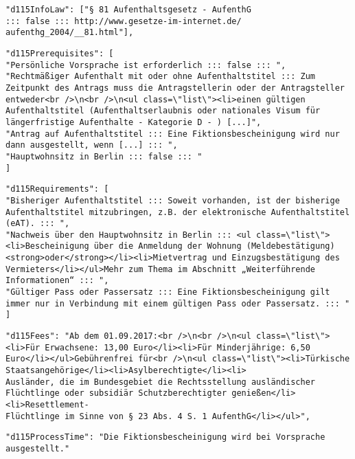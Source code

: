 \begin{verbatim}
"d115InfoLaw": ["§ 81 Aufenthaltsgesetz - AufenthG 
::: false ::: http://www.gesetze-im-internet.de/
aufenthg_2004/__81.html"],
\end{verbatim}

\begin{verbatim}
"d115Prerequisites": [
"Persönliche Vorsprache ist erforderlich ::: false ::: ",
"Rechtmäßiger Aufenthalt mit oder ohne Aufenthaltstitel ::: Zum Zeitpunkt des Antrags muss die Antragstellerin oder der Antragsteller entweder<br />\n<br />\n<ul class=\"list\"><li>einen gültigen Aufenthaltstitel (Aufenthaltserlaubnis oder nationales Visum für längerfristige Aufenthalte - Kategorie D - ) [...]",
"Antrag auf Aufenthaltstitel ::: Eine Fiktionsbescheinigung wird nur dann ausgestellt, wenn [...] ::: ",
"Hauptwohnsitz in Berlin ::: false ::: "
]
\end{verbatim}

\begin{verbatim}
"d115Requirements": [
"Bisheriger Aufenthaltstitel ::: Soweit vorhanden, ist der bisherige Aufenthaltstitel mitzubringen, z.B. der elektronische Aufenthaltstitel (eAT). ::: ",
"Nachweis über den Hauptwohnsitz in Berlin ::: <ul class=\"list\"><li>Bescheinigung über die Anmeldung der Wohnung (Meldebestätigung) <strong>oder</strong></li><li>Mietvertrag und Einzugsbestätigung des Vermieters</li></ul>Mehr zum Thema im Abschnitt „Weiterführende Informationen“ ::: ",
"Gültiger Pass oder Passersatz ::: Eine Fiktionsbescheinigung gilt immer nur in Verbindung mit einem gültigen Pass oder Passersatz. ::: "
]
\end{verbatim}


\begin{verbatim}
"d115Fees": "Ab dem 01.09.2017:<br />\n<br />\n<ul class=\"list\"><li>Für Erwachsene: 13,00 Euro</li><li>Für Minderjährige: 6,50 Euro</li></ul>Gebührenfrei für<br />\n<ul class=\"list\"><li>Türkische Staatsangehörige</li><li>Asylberechtigte</li><li>
Ausländer, die im Bundesgebiet die Rechtsstellung ausländischer Flüchtlinge oder subsidiär Schutzberechtigter genießen</li><li>Resettlement-
Flüchtlinge im Sinne von § 23 Abs. 4 S. 1 AufenthG</li></ul>",
\end{verbatim}

\begin{verbatim}
"d115ProcessTime": "Die Fiktionsbescheinigung wird bei Vorsprache ausgestellt."
\end{verbatim}

